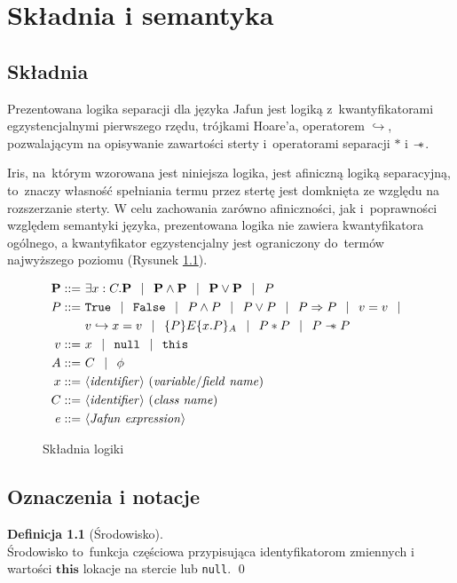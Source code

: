 \documentclass[]{pracamgr}
\newcommand \wand {\mathrel{-\mkern-6mu*}}
\newcommand \outerP {\mathbf{P}}
\newcommand \hoare [5] {\{#1\}#2\{#4.#5\}_#3}
\renewcommand \| {\hspace{0.75em} | \hspace{0.75em} }
\renewcommand \[ {[\![}
\renewcommand \] {]\!]}
\theoremstyle{definition}
\newtheorem{definition}{Definicja}[section]
\newcommand{\jthis}{\textbf{this}\xspace}
\begin{document}
\chapter{Składnia i semantyka}

\section{Składnia}
Prezentowana logika separacji dla języka Jafun jest logiką z~kwantyfikatorami egzystencjalnymi pierwszego rzędu, trójkami Hoare'a, operatorem $\hookrightarrow$,
pozwalającym na opisywanie zawartości sterty i~operatorami separacji $*$ i $\wand$.

Iris, na~którym wzorowana jest niniejsza logika, jest afiniczną logiką separacyjną, to~znaczy
własność spełniania termu przez stertę jest domknięta ze względu na rozszerzanie sterty.
W celu zachowania zarówno afiniczności, jak i~poprawności względem semantyki
języka, prezentowana logika nie zawiera kwantyfikatora ogólnego,
a kwantyfikator egzystencjalny jest ograniczony
do~termów najwyższego poziomu (Rysunek \ref{fig:syntax}).


\begin{figure}[h]
\begin{align*}
 \outerP ::= & \ \exists x : C.\outerP \| \outerP \wedge \outerP \| \outerP \vee \outerP \| P \\
 P ::= & \ \mathtt{True} \| \mathtt{False} \| P \wedge P \| P \vee P \| P \Rightarrow P \| v = v \| \\
     & \  v \hookrightarrow x = v \| \hoare{P}{E}{A}{x}{P} \|  P * P \| P \wand P \\
 v ::= & \  x \| \mathtt{null} \| \mathtt{this} \\
 A ::= & \ C \| \phi \\
 x ::= & \ \langle\mathit{identifier}\rangle \ (\mathit{variable / field\ name}) \\
 C ::= & \ \langle\mathit{identifier}\rangle \ (\mathit{class\ name}) \\
 e ::= & \ \langle \mathit{Jafun\ expression} \rangle
\end{align*}
\caption{Składnia logiki}
\label{fig:syntax}
\end{figure}

\section{Oznaczenia i notacje}

\begin{definition}[Środowisko]{\ } \\
Środowisko to~funkcja częściowa przypisująca identyfikatorom zmiennych i wartości $\jthis$
lokacje na stercie lub \texttt{null}.
\qed
\end{definition}
\end{document}
